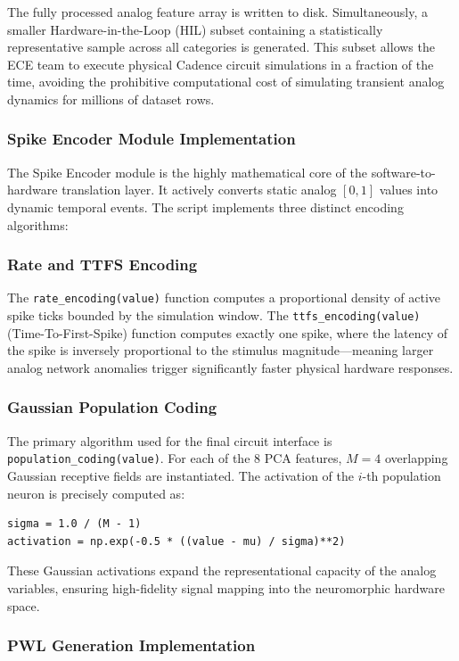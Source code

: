 \documentclass{ieeeaccess}
\begin{document}
The fully processed analog feature array is written to disk. Simultaneously, a smaller Hardware-in-the-Loop (HIL) subset containing a statistically representative sample across all categories is generated. This subset allows the ECE team to execute physical Cadence circuit simulations in a fraction of the time, avoiding the prohibitive computational cost of simulating transient analog dynamics for millions of dataset rows.

\subsubsection{Spike Encoder Module Implementation}

The Spike Encoder module is the highly mathematical core of the software-to-hardware translation layer. It actively converts static analog $[0, 1]$ values into dynamic temporal events. The script implements three distinct encoding algorithms:

\subsubsection{Rate and TTFS Encoding}
The \texttt{rate\_encoding(value)} function computes a proportional density of active spike ticks bounded by the simulation window. The \texttt{ttfs\_encoding(value)} (Time-To-First-Spike) function computes exactly one spike, where the latency of the spike is inversely proportional to the stimulus magnitude—meaning larger analog network anomalies trigger significantly faster physical hardware responses.

\subsubsection{Gaussian Population Coding}
The primary algorithm used for the final circuit interface is \texttt{population\_coding(value)}. For each of the 8 PCA features, $M=4$ overlapping Gaussian receptive fields are instantiated. The activation of the $i$-th population neuron is precisely computed as:
\begin{verbatim}
sigma = 1.0 / (M - 1)
activation = np.exp(-0.5 * ((value - mu) / sigma)**2)
\end{verbatim}
These Gaussian activations expand the representational capacity of the analog variables, ensuring high-fidelity signal mapping into the neuromorphic hardware space. 

\subsubsection{PWL Generation Implementation}
\end{document}

